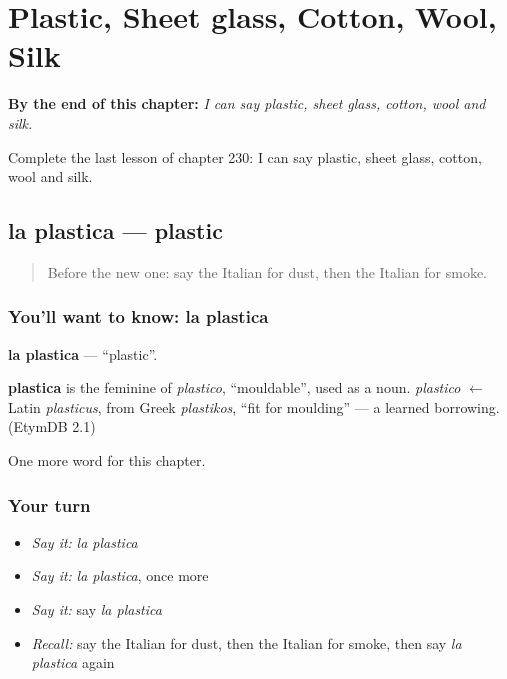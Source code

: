 
\chapter{Plastic, Sheet glass, Cotton, Wool, Silk}
\label{ch:it-plastic-sheet-glass-cotton-wool-silk}

\begin{chapteropening}
\textbf{By the end of this chapter:} \emph{I can say plastic, sheet glass, cotton, wool and silk.}

Complete the last lesson of chapter 230: I can say plastic, sheet glass, cotton, wool and silk.
\end{chapteropening}

\section[la plastica]{la plastica — plastic}

\label{lesson:IT-C230-plastica}



\begin{quote}
Before the new one: say the Italian for dust, then the Italian for smoke.
\end{quote}

\subsection*{You'll want to know: la plastica}
\textbf{la plastica} — \textquotedblleft{}plastic\textquotedblright{}.

\begin{cousinweb}
\textbf{plastica} is the feminine of \emph{plastico}, \textquotedblleft{}mouldable\textquotedblright{}, used as a noun. \emph{plastico} $\leftarrow$ Latin \emph{plasticus}, from Greek \emph{plastikos}, \textquotedblleft{}fit for moulding\textquotedblright{} — a learned borrowing. (EtymDB 2.1)
\end{cousinweb}

\begin{grammarlens}[title={What you've built}]
One more word for this chapter.
\end{grammarlens}

\subsection*{Your turn}
\begin{itemize}
\raggedright
  \item \emph{Say it:} \emph{la plastica}
  \item \emph{Say it:} \emph{la plastica}, once more
  \item \emph{Say it:} say \emph{la plastica}
  \item \emph{Recall:} say the Italian for dust, then the Italian for smoke, then say \emph{la plastica} again
\end{itemize}

